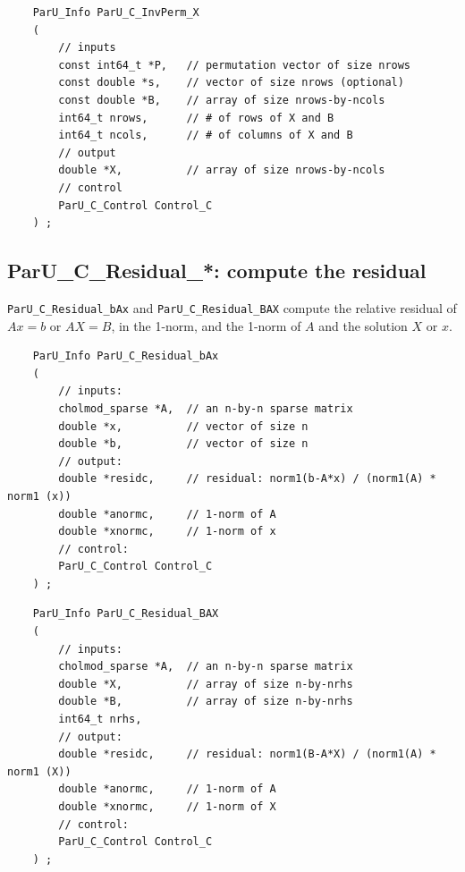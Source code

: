 \documentclass[12pt]{article}
\begin{document}
    {\footnotesize
    \begin{verbatim}
    ParU_Info ParU_C_InvPerm_X
    (
        // inputs
        const int64_t *P,   // permutation vector of size nrows
        const double *s,    // vector of size nrows (optional)
        const double *B,    // array of size nrows-by-ncols
        int64_t nrows,      // # of rows of X and B
        int64_t ncols,      // # of columns of X and B
        // output
        double *X,          // array of size nrows-by-ncols
        // control
        ParU_C_Control Control_C
    ) ; \end{verbatim} }

\subsection{{\sf ParU\_C\_Residual\_*}: compute the residual}

    \verb'ParU_C_Residual_bAx' and \verb'ParU_C_Residual_BAX' compute the
    relative residual of $Ax=b$ or $AX=B$, in the 1-norm, and the 1-norm of $A$
    and the solution $X$ or $x$.

    {\footnotesize
    \begin{verbatim}
    ParU_Info ParU_C_Residual_bAx
    (
        // inputs:
        cholmod_sparse *A,  // an n-by-n sparse matrix
        double *x,          // vector of size n
        double *b,          // vector of size n
        // output:
        double *residc,     // residual: norm1(b-A*x) / (norm1(A) * norm1 (x))
        double *anormc,     // 1-norm of A
        double *xnormc,     // 1-norm of x
        // control:
        ParU_C_Control Control_C
    ) ; \end{verbatim} }

    {\footnotesize
    \begin{verbatim}
    ParU_Info ParU_C_Residual_BAX
    (
        // inputs:
        cholmod_sparse *A,  // an n-by-n sparse matrix
        double *X,          // array of size n-by-nrhs
        double *B,          // array of size n-by-nrhs
        int64_t nrhs,
        // output:
        double *residc,     // residual: norm1(B-A*X) / (norm1(A) * norm1 (X))
        double *anormc,     // 1-norm of A
        double *xnormc,     // 1-norm of X
        // control:
        ParU_C_Control Control_C
    ) ; \end{verbatim} }
\end{document}
